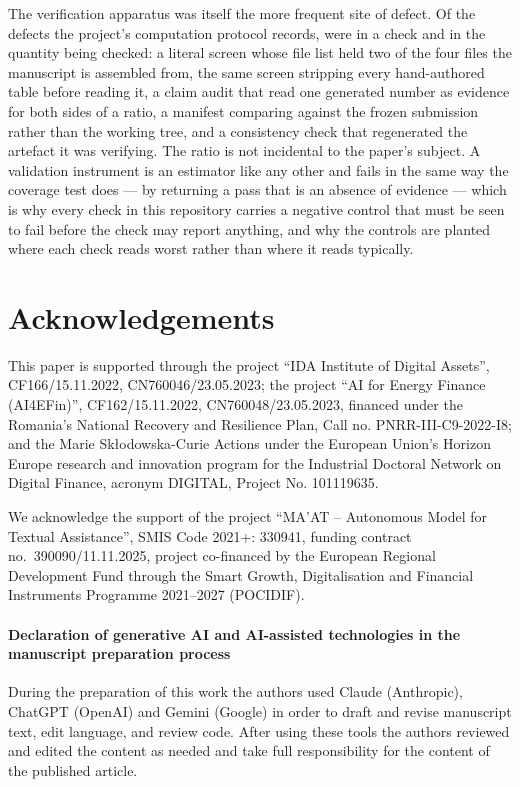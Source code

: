 \documentclass[preprint,11pt,authoryear]{elsarticle}
\newcommand{\1}{\boldsymbol{1}}
\begin{document}
The verification apparatus was itself the more frequent site of defect. Of the \nHarnessDefectsTotal{} defects the project's computation protocol records, \nHarnessDefectsInstrument{} were in a check and \nHarnessDefectsObject{} in the quantity being checked: a literal screen whose file list held two of the four files the manuscript is assembled from, the same screen stripping every hand-authored table before reading it, a claim audit that read one generated number as evidence for both sides of a ratio, a manifest comparing against the frozen submission rather than the working tree, and a consistency check that regenerated the artefact it was verifying. The ratio is not incidental to the paper's subject. A validation instrument is an estimator like any other and fails in the same way the coverage test does --- by returning a pass that is an absence of evidence --- which is why every check in this repository carries a negative control that must be seen to fail before the check may report anything, and why the controls are planted where each check reads worst rather than where it reads typically.


	\section*{Acknowledgements}
	This paper is supported through the project ``IDA Institute of Digital Assets'', CF166/15.11.2022, CN760046/23.05.2023; the project ``AI for Energy Finance (AI4EFin)'', CF162/15.11.2022, CN760048/23.05.2023, financed under the Romania's National Recovery and Resilience Plan, Call no. PNRR-III-C9-2022-I8; and the Marie Skłodowska-Curie Actions under the European Union's Horizon Europe research and innovation program for the Industrial Doctoral Network on Digital Finance, acronym DIGITAL, Project No. 101119635.
	
	We acknowledge the support of the project ``MA'AT -- Autonomous
	Model for Textual Assistance'', SMIS Code 2021+: 330941, funding contract no.\ 390090/11.11.2025, project co-financed by the European Regional Development Fund through the Smart Growth, Digitalisation and Financial Instruments Programme 2021--2027 (POCIDIF).

	\paragraph*{Declaration of generative AI and AI-assisted technologies in the manuscript preparation process}
	During the preparation of this work the authors used Claude (Anthropic), ChatGPT (OpenAI) and Gemini (Google) in order to draft and revise manuscript text, edit language, and review code. After using these tools the authors reviewed and edited the content as needed and take full responsibility for the content of the published article.
\end{document}
